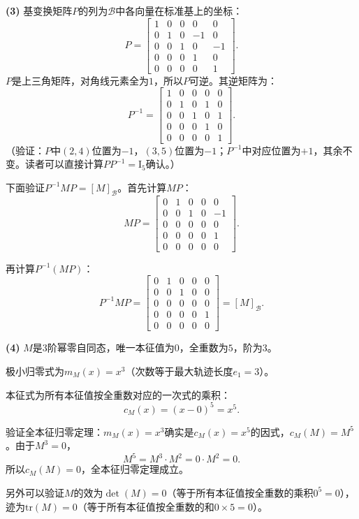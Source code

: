 \documentclass[12pt,UTF8,fontset=none]{ctexbook}
\begin{document}
\begin{so}
\textbf{(3)} 基变换矩阵$P$的列为$\mathcal{B}$中各向量在标准基上的坐标：
$$
P = \begin{bmatrix}
1 & 0 & 0 & 0 & 0 \\
0 & 1 & 0 & -1 & 0 \\
0 & 0 & 1 & 0 & -1 \\
0 & 0 & 0 & 1 & 0 \\
0 & 0 & 0 & 0 & 1
\end{bmatrix}.
$$
$P$是上三角矩阵，对角线元素全为$1$，所以$P$可逆。其逆矩阵为：
$$
P^{-1} = \begin{bmatrix}
1 & 0 & 0 & 0 & 0 \\
0 & 1 & 0 & 1 & 0 \\
0 & 0 & 1 & 0 & 1 \\
0 & 0 & 0 & 1 & 0 \\
0 & 0 & 0 & 0 & 1
\end{bmatrix}.
$$
（验证：$P$中$(2,4)$位置为$-1$，$(3,5)$位置为$-1$；$P^{-1}$中对应位置为$+1$，其余不变。读者可以直接计算$PP^{-1}=\mathrm{I}_5$确认。）

下面验证$P^{-1}MP = [M]_{\mathcal{B}}$。首先计算$MP$：
$$
MP = \begin{bmatrix}
0 & 1 & 0 & 0 & 0 \\
0 & 0 & 1 & 0 & -1 \\
0 & 0 & 0 & 0 & 0 \\
0 & 0 & 0 & 0 & 1 \\
0 & 0 & 0 & 0 & 0
\end{bmatrix}.
$$

再计算$P^{-1}(MP)$：
$$
P^{-1}MP = \begin{bmatrix}
0 & 1 & 0 & 0 & 0 \\
0 & 0 & 1 & 0 & 0 \\
0 & 0 & 0 & 0 & 0 \\
0 & 0 & 0 & 0 & 1 \\
0 & 0 & 0 & 0 & 0
\end{bmatrix} = [M]_{\mathcal{B}}. 
$$

\textbf{(4)} $M$是$3$阶幂零自同态，唯一本征值为$0$，全重数为$5$，阶为$3$。

极小归零式为$m_M(x) = x^3$（次数等于最大轨迹长度$e_1 = 3$）。

本征式为所有本征值按全重数对应的一次式的乘积：
$$c_M(x) = (x - 0)^5 = x^5.$$

验证全本征归零定理：$m_M(x) = x^3$确实是$c_M(x) = x^5$的因式，$c_M(M) = M^5$。由于$M^3 = 0$，
$$M^5 = M^3 \cdot M^2 = 0 \cdot M^2 = 0.$$
所以$c_M(M) = 0$，全本征归零定理成立。

另外可以验证$M$的效为$\det(M) = 0$（等于所有本征值按全重数的乘积$0^5 = 0$），迹为$\mathrm{tr}(M) = 0$（等于所有本征值按全重数的和$0 \times 5 = 0$）。
\end{so}
\end{document}
